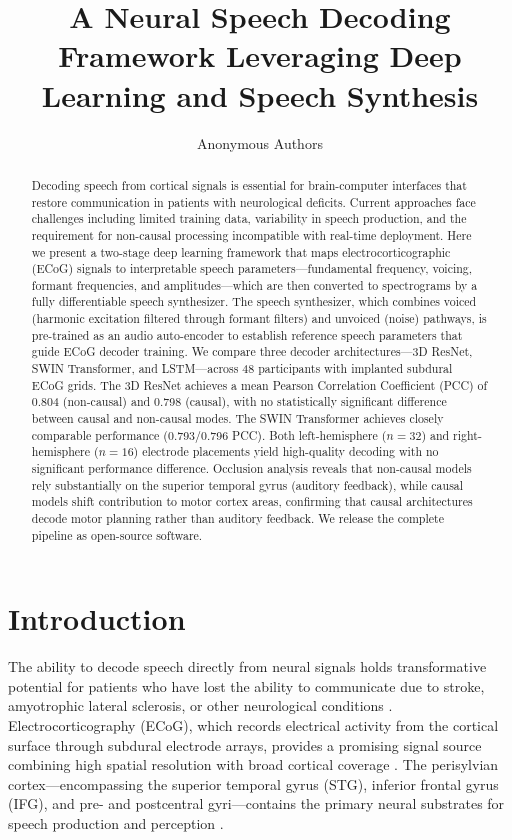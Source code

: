 \documentclass[11pt]{article}
\title{A Neural Speech Decoding Framework Leveraging Deep Learning and Speech Synthesis}
\author{Anonymous Authors}
\date{}
\begin{document}
\maketitle

\begin{abstract}
Decoding speech from cortical signals is essential for brain-computer interfaces that restore communication in patients with neurological deficits. Current approaches face challenges including limited training data, variability in speech production, and the requirement for non-causal processing incompatible with real-time deployment. Here we present a two-stage deep learning framework that maps electrocorticographic (ECoG) signals to interpretable speech parameters---fundamental frequency, voicing, formant frequencies, and amplitudes---which are then converted to spectrograms by a fully differentiable speech synthesizer. The speech synthesizer, which combines voiced (harmonic excitation filtered through formant filters) and unvoiced (noise) pathways, is pre-trained as an audio auto-encoder to establish reference speech parameters that guide ECoG decoder training. We compare three decoder architectures---3D ResNet, SWIN Transformer, and LSTM---across 48 participants with implanted subdural ECoG grids. The 3D ResNet achieves a mean Pearson Correlation Coefficient (PCC) of 0.804 (non-causal) and 0.798 (causal), with no statistically significant difference between causal and non-causal modes. The SWIN Transformer achieves closely comparable performance (0.793/0.796 PCC). Both left-hemisphere ($n=32$) and right-hemisphere ($n=16$) electrode placements yield high-quality decoding with no significant performance difference. Occlusion analysis reveals that non-causal models rely substantially on the superior temporal gyrus (auditory feedback), while causal models shift contribution to motor cortex areas, confirming that causal architectures decode motor planning rather than auditory feedback. We release the complete pipeline as open-source software.
\end{abstract}

\section{Introduction}

The ability to decode speech directly from neural signals holds transformative potential for patients who have lost the ability to communicate due to stroke, amyotrophic lateral sclerosis, or other neurological conditions \citep{moses2021,willett2023,metzger2023}. Electrocorticography (ECoG), which records electrical activity from the cortical surface through subdural electrode arrays, provides a promising signal source combining high spatial resolution with broad cortical coverage \citep{cogan2014}. The perisylvian cortex---encompassing the superior temporal gyrus (STG), inferior frontal gyrus (IFG), and pre- and postcentral gyri---contains the primary neural substrates for speech production and perception \citep{hickok2007,bouchard2013}.
\end{document}
